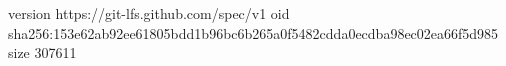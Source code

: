 version https://git-lfs.github.com/spec/v1
oid sha256:153e62ab92ee61805bdd1b96bc6b265a0f5482cdda0ecdba98ec02ea66f5d985
size 307611
